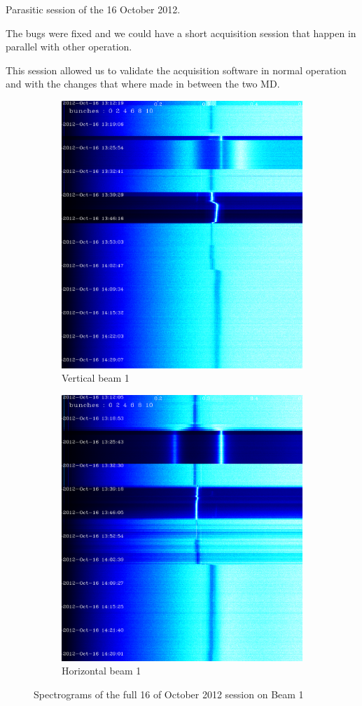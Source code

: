 Parasitic session of the 16 October 2012. 

The bugs were fixed and we could have a short acquisition session that happen in parallel with other operation.

This session allowed us to validate the acquisition software in normal operation and with the changes that where made in between the two \gls{MD}.

\begin{figure}[H]
\centering
\begin{subfigure}{.5\textwidth}
  \centering
  \includegraphics[width=.8\linewidth]{md-121016-vb1-bunches111111-16.png}
  \caption{Vertical beam 1}
\end{subfigure}%
\begin{subfigure}{.5\textwidth}
  \centering
  \includegraphics[width=.8\linewidth]{md-121016-hb1-bunches111111-16.png}
  \caption{Horizontal beam 1}
\end{subfigure}
\caption{Spectrograms of the full 16 of October 2012 session on Beam 1}
\end{figure}

